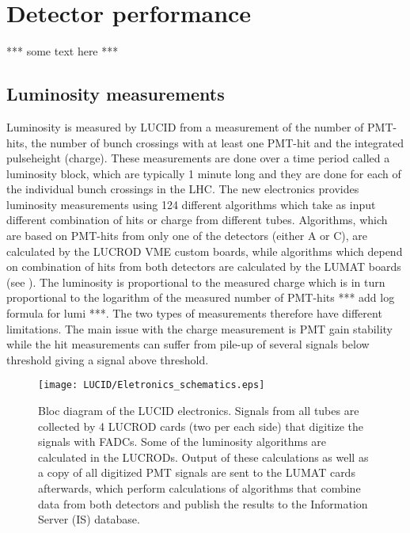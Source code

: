 \section{Detector performance}
\label{sec:DetPerf}

*** some text here ***

\subsection{Luminosity measurements}
\label{subsec:lumMeas}

Luminosity is measured by LUCID from a measurement of the number of PMT-hits, the number of bunch crossings 
with at least one PMT-hit and the integrated pulseheight (charge). These measurements are done over a time 
period called a luminosity block, which are typically 1 minute long and they are done for each of the 
individual bunch crossings in the LHC. 
The new electronics provides luminosity measurements using 124 different algorithms which take as input 
different combination of hits or charge from different tubes. Algorithms, which are based on PMT-hits from only 
one of the detectors (either A or C), are calculated by the LUCROD VME custom boards, while algorithms which depend on 
combination of hits from both detectors are calculated by the LUMAT boards (see 
).
The luminosity is proportional to the measured charge which is in turn proportional to the logarithm of the measured 
number of PMT-hits *** add log formula for lumi ***. The two types of measurements therefore have different limitations. The main issue with the 
charge measurement is PMT gain stability while the hit measurements can suffer from pile-up of several signals 
below threshold giving a signal above threshold.

\begin{figure}
\centering
\texttt{[image: LUCID/Eletronics\_schematics.eps]}
\caption{Bloc diagram of the LUCID electronics. Signals from all tubes are collected by 4 \mbox{LUCROD} cards 
(two per 
each side) that digitize the signals with FADCs. Some of the luminosity algorithms are calculated in the LUCRODs. 
Output of these calculations as well as a copy of all digitized PMT 
signals are sent to the LUMAT cards afterwards, which perform calculations of algorithms that combine data from 
both detectors and publish the results to the Information Server (IS) database.}
\label{fig:Eletronics_schematics}
\end{figure}


